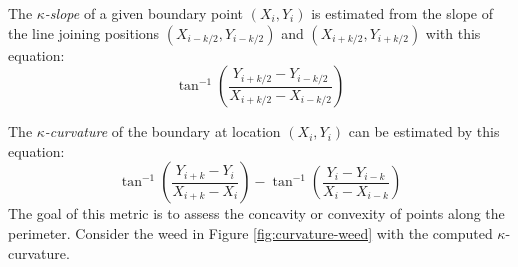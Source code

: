 \documentclass[letterpaper, notitlepage]{report}
\begin{document}
{The \textit{$\kappa$-slope} of a given boundary point $(X_i, Y_i)$ is estimated from the slope of the line joining positions $(X_{i-k/2}, Y_{i-k/2})$ and $(X_{i+k/2}, Y_{i+k/2})$ with this equation:
\begin{equation}
\tan^{-1}\left(\frac{Y_{i+k/2} - Y_{i-k/2}}{X_{i+k/2} - X_{i-k/2}}\right)
\end{equation}
 
 The \textit{$\kappa$-curvature} of the boundary at location $(X_i,Y_i)$ can be estimated by this equation:
 \begin{equation}
 \tan^{-1}\left(\frac{Y_{i+k} - Y_{i}}{X_{i+k} - X_{i}}\right) - \tan^{-1}\left(\frac{Y_{i} - Y_{i-k}}{X_{i} - X_{i-k} }\right)
 \end{equation}
 The goal of this metric is to assess the concavity or convexity of points along the perimeter. Consider the weed in Figure \ref{fig:curvature-weed} with the computed $\kappa$-curvature.
 
}
\end{document}
